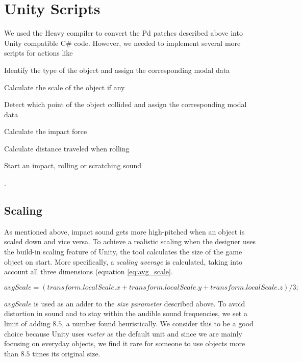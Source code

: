 \section{Unity Scripts}
We used the Heavy \cite{bib:heavy} compiler to convert the Pd patches described above into Unity compatible C\# code. However, we needed to implement several more scripts for actions like 
\begin{inparaenum}[1)]
\item Identify the type of the object and assign the corresponding modal data
\item Calculate the scale of the object if any
\item Detect which point of the object collided and assign the corresponding modal data
\item Calculate the impact force
\item Calculate distance traveled when rolling
\item Start an impact, rolling or scratching sound 
\end{inparaenum}.   

\subsection{Scaling}
As mentioned above, impact sound gets more high-pitched when an object is scaled down and vice versa. To achieve a realistic scaling when the designer uses the build-in scaling feature of Unity\textregistered, the tool calculates the size of the game object on start. More specifically, a \textit{scaling average} is calculated, taking into account all three dimensions (equation \ref{eq:avg_scale}.

\begin{equation}\label{eq:avg_scale}
avgScale = (transform.localScale.x + transform.localScale.y + transform.localScale.z) / 3;
\end{equation}

$avgScale$ is used as an adder to the \textit{size parameter} described above. To avoid distortion in sound and to stay within the audible sound frequencies, we set a limit of adding $8.5$, a number found heuristically. We consider this to be a good choice because Unity uses \textit{meter} as the default unit and since we are mainly focusing on everyday objects, we find it rare for someone to use objects more than $8.5$ times its original size.

